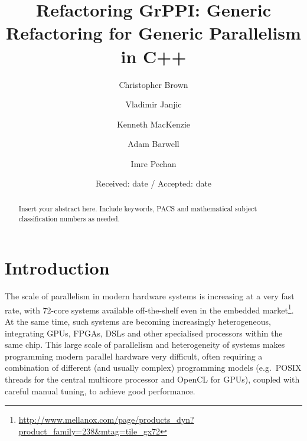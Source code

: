 \title{Refactoring GrPPI: Generic Refactoring for Generic Parallelism in C++}%



\author{Christopher Brown         \and
        Vladimir Janjic \and 
        Kenneth MacKenzie \and
        Adam Barwell \and
        Imre Pechan
}



\date{Received: date / Accepted: date}


\maketitle

\begin{abstract}
Insert your abstract here. Include keywords, PACS and mathematical
subject classification numbers as needed.
\end{abstract}

\section{Introduction}
\label{intro}

\noindent
The scale of parallelism in modern hardware systems is increasing at a very fast rate, with 72-core systems available off-the-shelf even in the embedded market\footnote{\url{http://www.mellanox.com/page/products_dyn?product_family=238&mtag=tile_gx72}}. At the same time, such systems are becoming increasingly heterogeneous, integrating GPUs, FPGAs, DSLs and other specialised processors within the same chip. This large scale of parallelism and heterogeneity of systems makes programming modern parallel hardware very difficult, often requiring a combination of different (and usually complex) programming models (e.g.~POSIX threads for the central multicore processor and OpenCL for GPUs), coupled with careful manual tuning, to achieve good performance. 

